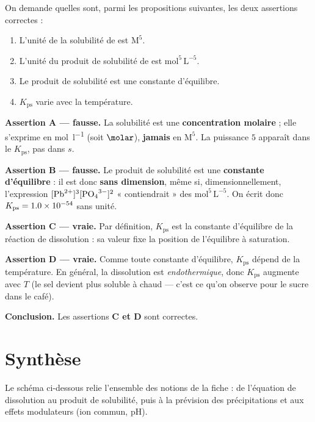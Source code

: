 \documentclass[11pt,a4paper]{article}
\newcommand{\Kps}{K_{\mathrm{ps}}}
\begin{document}
\begin{exemple}
On demande quelles sont, parmi les propositions suivantes, les deux assertions correctes :
\begin{enumerate}[label=\textbf{\Alph*.},leftmargin=2em,topsep=1pt,itemsep=1pt]
  \item L'unité de la solubilité de  est $\mathrm{M}^{5}$.
  \item L'unité du produit de solubilité de  est $\mathrm{mol^{5}\,L^{-5}}$.
  \item Le produit de solubilité est une constante d'équilibre.
  \item $\Kps$ varie avec la température.
\end{enumerate}

\smallskip
\textbf{Assertion A — fausse.} La solubilité est une \textbf{concentration molaire} ; elle s'exprime
en \si{\mole\per\litre} (soit $\si{\molar}$), \textbf{jamais} en $\mathrm{M}^{5}$. La puissance $5$
apparaît dans le $\Kps$, pas dans $s$.

\textbf{Assertion B — fausse.} Le produit de solubilité est une \textbf{constante d'équilibre} : il
est donc \textbf{sans dimension}, même si, dimensionnellement, l'expression
$[\ce{Pb^{2+}}]^{3}[\ce{PO4^{3-}}]^{2}$ « contiendrait » des $\mathrm{mol^{5}\,L^{-5}}$.
On écrit donc $\Kps=\num{1{,}0e-54}$ sans unité.

\textbf{Assertion C — vraie.} Par définition, $\Kps$ est la constante d'équilibre de la réaction de
dissolution : sa valeur fixe la position de l'équilibre à saturation.

\textbf{Assertion D — vraie.} Comme toute constante d'équilibre, $\Kps$ dépend de la température. En
général, la dissolution est \emph{endothermique}, donc $\Kps$ augmente avec $T$ (le sel devient plus
soluble à chaud — c'est ce qu'on observe pour le sucre dans le café).

\smallskip
\textbf{Conclusion.} Les assertions \textbf{C et D} sont correctes.
\end{exemple}

\section{Synthèse}

\noindent Le schéma ci-dessous relie l'ensemble des notions de la fiche : de l'équation de dissolution
au produit de solubilité, puis à la prévision des précipitations et aux effets modulateurs
(ion commun, pH).
\end{document}
